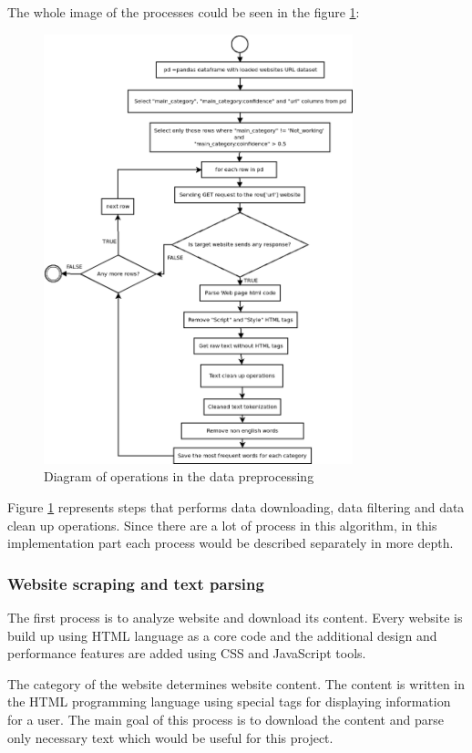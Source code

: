 The whole image of the processes could be seen in the figure \ref{fig:dataset_creation}:
\begin{figure}[H]
\centering
\includegraphics[width=0.8\textwidth]{Pictures/dataset_creation.png}
\caption{\label{fig:dataset_creation}{}Diagram of operations in the data preprocessing}
\end{figure}

Figure \ref{fig:dataset_creation} represents steps that performs data downloading, data filtering and data clean up operations. Since there are a lot of process in this algorithm, in this implementation part each process would be described separately in more depth. 

\subsubsection{Website scraping and text parsing}

The first process is to analyze website and download its content. Every website is build up using HTML language as a core code and the additional design and performance features are added using CSS and JavaScript tools.

The category of the website determines website content. The content is written in the HTML programming language using special tags for displaying information for a user. The main goal of this process is to download the content and parse only necessary text which would be useful for this project. 

